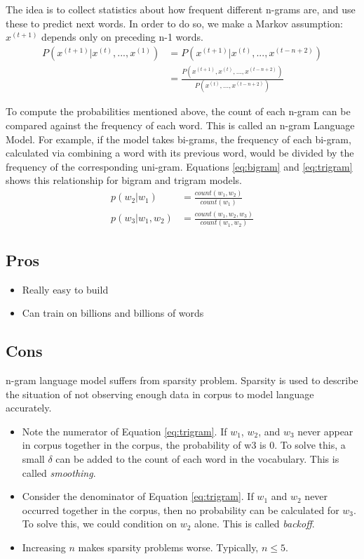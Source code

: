 \documentclass[letterpaper]{article}
\begin{document}
The idea is to collect statistics about how frequent different n-grams are,
and use these to predict next words. In order to do so, we make a Markov
assumption: $x^{(t+1)}$ depends only on preceding n-1 words.
\begin{align}
	P(x^{(t+1)}|x^{(t)},...,x^{(1)}) &= P(x^{(t+1)}|x^{(t)},...,x^{(t-n+2)}) \label{eq:assumption} \\
	&= \frac{P(x^{(t+1)},x^{(t)},...,x^{(t-n+2)})}{P(x^{(t)},...,x^{(t-n+2)})} \label{eq:condprob}
\end{align}

To compute the probabilities mentioned above, the count of each
n-gram can be compared against the frequency of each word.
This is called an n-gram Language Model. For example, if the model
takes bi-grams, the frequency of each bi-gram, calculated via combining
a word with its previous word, would be divided by the frequency of
the corresponding uni-gram. Equations \ref{eq:bigram} and \ref{eq:trigram}
shows this relationship for bigram and trigram models.
\begin{align}
	p(w_2|w_1) &= \frac{count(w_1,w_2)}{count(w_1)} \label{eq:bigram} \\
	p(w_3|w_1,w_2) &= \frac{count(w_1,w_2,w_3)}{count(w_1,w_2)} \label{eq:trigram}
\end{align}

\subsection{Pros}
\begin{itemize}
	\item Really easy to build
	\item Can train on billions and billions of words
\end{itemize}

\subsection{Cons}
n-gram language model suffers from sparsity problem. Sparsity is used
to describe the situation of not observing enough data in corpus to
model language accurately. 

\begin{itemize}
	\item Note the numerator of Equation \ref{eq:trigram}. If $w_1$, $w_2$,
	and $w_3$ never appear in corpus together in the corpus, the probability of 
	w3 is 0. To solve this, a small $\delta$ can be added to the count of each 
	word in the vocabulary. This is called \textit{smoothing}.
	\item Consider the denominator of Equation \ref{eq:trigram}. 
	If $w_1$ and $w_2$ never occurred together in the corpus, then 
	no probability can be calculated for $w_3$.
	To solve this, we could condition on $w_2$ alone. This is called
	\textit{backoff}.
	\item Increasing $n$ makes sparsity problems worse. Typically, $n \leq 5$.
\end{itemize}
\end{document}

